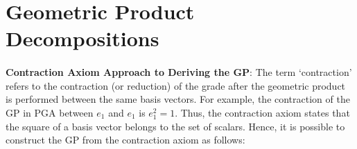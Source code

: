 \documentclass{article}
\begin{document}
\section{Geometric Product Decompositions}

\paragraph{}\textbf{Contraction Axiom Approach to Deriving the GP}: The term `contraction' refers to the 
contraction (or reduction) of the grade after the geometric product is performed between the same basis vectors.
For example, the contraction of the GP in PGA between $e_1$ and $e_1$ is $e_1^2 = 1$.
Thus, the contraction axiom states that the square of a basis vector belongs to the set of scalars.
Hence, it is possible to construct the GP from the contraction axiom as follows:
\end{document}
